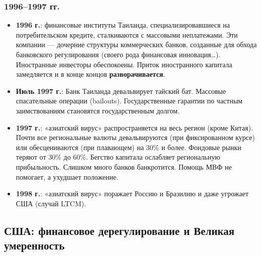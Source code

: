 \documentclass[10pt,a4paper]{article}
\begin{document}
\subsubsection{1996--1997 гг.}
\begin{itemize}[leftmargin=1.3em]
\item \textbf{1996 г.}: финансовые институты Таиланда, специализировавшиеся на потребительском кредите, сталкиваются с массовыми неплатежами. Эти компании — дочерние структуры коммерческих банков, созданные для обхода банковского регулирования (своего рода финансовая инновация\ldots). Иностранные инвесторы обеспокоены. Приток иностранного капитала замедляется и в конце концов \textbf{разворачивается}.
\item \textbf{Июль 1997 г.}: Банк Таиланда девальвирует тайский бат. Массовые спасательные операции (bailouts). Государственные гарантии по частным заимствованиям становятся государственным долгом.
\item \textbf{1997 г.}: «азиатский вирус» распространяется на весь регион (кроме Китая). Почти все региональные валюты девальвируются (при фиксированном курсе) или обесцениваются (при плавающем) на 30\% и более. Фондовые рынки теряют от 30\% до 60\%. Бегство капитала ослабляет региональную прибыльность. Слишком много банков банкротится. Помощь МВФ не помогает, а ухудшает положение.
\item \textbf{1998 г.}: «азиатский вирус» поражает Россию и Бразилию и даже угрожает США (случай LTCM).
\end{itemize}

\subsection{США: финансовое дерегулирование и Великая умеренность}
\end{document}
